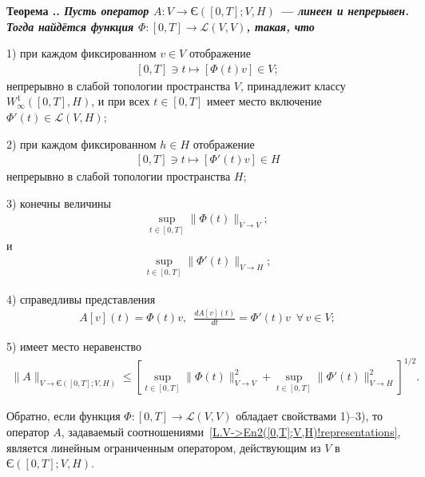 \documentclass{report}
\newcounter{rem}[section]
\newcounter{theor}[section]
\renewcommand{\thetheor}{\thesection.\arabic{theor}}
\newenvironment{Theorem}{\par\refstepcounter{theor}\bf Теорема \thetheor. \it}{\rm\par}
\begin{document}
\begin{Theorem}\label{L.V->En2([0,T];V,H)!theorem}
Пусть оператор $A:V\to\textrm{Є}([0,T];V,H)$ --- линеен и непрерывен. Тогда найдётся функция $\Phi:[0,T]\to\mathcal{L}(V,V)$, такая, что

1) при каждом фиксированном $v\in V$ отображение
\begin{gather}\label{L.V->En2([0,T];V,H)!t->Phi(t)v}
[0,T]\ni t\mapsto[\Phi(t)v]\in V;
\end{gather}
непрерывно в слабой топологии пространства $V$, принадлежит классу  $W^1_\infty([0,T],H)$,  и при всех $t\in[0,T]$ имеет место включение  $\Phi'(t)\in\mathcal{L}(V,H)$;

2) при каждом фиксированном $h\in H$ отображение
\begin{gather}\label{L.V->En2([0,T];V,H)!t->Phi.t(t)v}
[0,T]\ni t\mapsto[\Phi'(t)v]\in H
\end{gather}
непрерывно в слабой топологии пространства $H$;

3) конечны величины
\begin{gather}\label{L.V->En2([0,T];V,H)!sup.wrt.t.of.norm(Phi(t))}
\sup\limits_{t\in[0,T]}\|\Phi(t)\|_{V\to V};
\end{gather}
и
\begin{gather}\label{L.V->En2([0,T];V,H)!sup.wrt.t.of.norm(Phi'(t))}
\sup\limits_{t\in[0,T]}\|\Phi'(t)\|_{V\to H};
\end{gather}

4) справедливы представления
\begin{gather}\label{L.V->En2([0,T];V,H)!representations}
A[v](t)=\Phi(t)v,\,\,\,\frac{dA[v](t)}{dt}=\Phi'(t)v\,\,\,\forall\,v\in V;
\end{gather}

5) имеет место неравенство
\begin{gather}\label{L.V->En2([0,T];V,H)!norm}
\|A\|_{V\to\textrm{Є}([0,T];V,H)}\leqslant[\sup\limits_{t\in[0,T]}\|\Phi(t)\|^2_{V\to V}+\sup\limits_{t\in[0,T]}\|\Phi'(t)\|^2_{V\to H}]^{1/2}.
\end{gather}

Обратно, если функция $\Phi:[0,T]\to\mathcal{L}(V,V)$ обладает свойствами 1)--3), то оператор $A$, задаваемый соотношениями~\eqref{L.V->En2([0,T];V,H)!representations}, является линейным ограниченным оператором, действующим из $V$ в $\textrm{Є}([0,T];V,H)$.
\end{Theorem}
\end{document}
